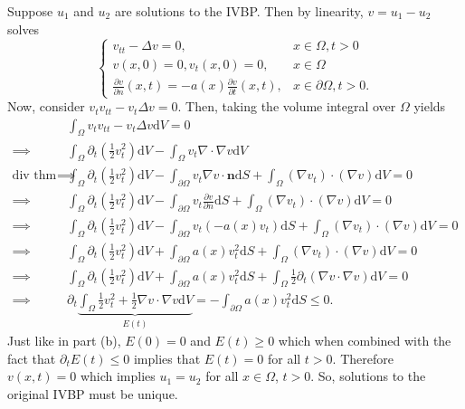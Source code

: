 \documentclass[a4paper,12pt]{article}
\newcommand{\dd}[1]{\mathrm{d}#1}
\begin{document}
\begin{enumerate}[label = \arabic*.]
\begin{enumerate}[label = (\alph*)]
		Suppose $ u_1 $ and $ u_2 $ are solutions to the IVBP. Then by linearity, $ v = u_1 - u_2 $ solves
		\[
			\begin{cases}
				v_{tt} - \Delta v = 0, & x \in \Omega, t > 0 \\
				v(x,0) = 0, v_t(x,0) = 0, & x\in \Omega \\
				\frac{\partial v}{\partial n}(x,t) = -a(x) \frac{\partial v}{\partial t} (x,t), & x \in \partial \Omega, t > 0.
			\end{cases}
		\]
		Now, consider $ v_t v_{tt} - v_t \Delta v = 0 $. Then, taking the volume integral over $ \Omega $ yields
		\begin{align*}
			& \int_\Omega v_t v_{tt} - v_t \Delta v \dd V = 0 \\
			\implies & \int_\Omega \partial_t \left(\frac{1}{2}v_t^2\right) \dd V - \int_\Omega v_t \nabla \cdot \nabla v \dd V \\
			\text{div thm w/ IPT}\implies & \int_\Omega \partial_t \left(\frac{1}{2}v_t^2\right) \dd V - \int_{\partial \Omega} v_t \nabla v \cdot \textbf{n} \dd S + \int_\Omega (\nabla v_t) \cdot (\nabla v) \dd V = 0 \\
			\implies & \int_\Omega \partial_t \left(\frac{1}{2}v_t^2\right) \dd V - \int_{\partial \Omega} v_t \frac{\partial v}{\partial n} \dd S + \int_\Omega (\nabla v_t) \cdot (\nabla v) \dd V = 0 \\
			\implies & \int_\Omega \partial_t \left(\frac{1}{2}v_t^2\right) \dd V - \int_{\partial \Omega} v_t (-a(x)v_t) \dd S + \int_\Omega (\nabla v_t) \cdot (\nabla v) \dd V = 0 \\
			\implies & \int_\Omega \partial_t \left(\frac{1}{2}v_t^2\right) \dd V + \int_{\partial \Omega} a(x)v_t^2 \dd S + \int_\Omega (\nabla v_t) \cdot (\nabla v) \dd V = 0 \\
			\implies & \int_\Omega \partial_t \left(\frac{1}{2}v_t^2\right) \dd V + \int_{\partial \Omega} a(x)v_t^2 \dd S + \int_\Omega \frac{1}{2} \partial_t (\nabla v \cdot \nabla v) \dd V = 0 \\
			\implies & \partial_t \underbrace{\int_\Omega \frac{1}{2} v_t^2 + \frac{1}{2} \nabla v \cdot \nabla v \dd V}_{E(t)} = -\int_{\partial \Omega} a(x)v_t^2 \dd S \leq 0.
		\end{align*}
		Just like in part (b), $ E(0) = 0 $ and $ E(t) \geq 0 $ which when combined with the fact that $ \partial_t E(t) \leq 0 $ implies that $ E(t) = 0 $ for all $ t > 0 $. Therefore $ v(x,t) = 0 $ which implies $ u_1 = u_2 $ for all $ x \in \Omega $, $ t > 0 $. So, solutions to the original IVBP must be unique.
	\end{enumerate}


\end{enumerate}
\end{document}

